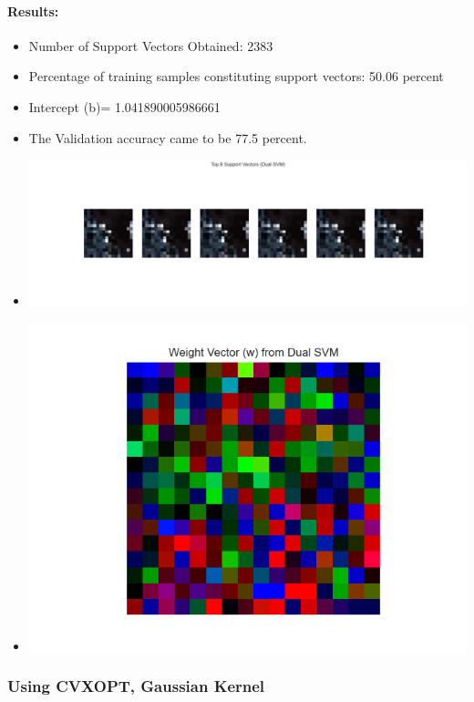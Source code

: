 \documentclass[12pt,a4paper]{article}
\begin{document}
\paragraph{Results:}
\begin{itemize}
    \item Number of Support Vectors Obtained: 2383
    \item Percentage of training samples constituting support vectors: 50.06 percent
    \item Intercept (b)= 1.041890005986661
    \item The Validation accuracy came to be 77.5 percent.
    \item \includegraphics[width=\textwidth]{Assignment 2/q2/top_6_support_vectors_dual cvxopt linear.png}
    \item \includegraphics[width=\textwidth]{Assignment 2/q2/weight_vector_dual cvxopt linear.png}
\end{itemize}

\subsubsection{Using CVXOPT, Gaussian Kernel}
\end{document}
